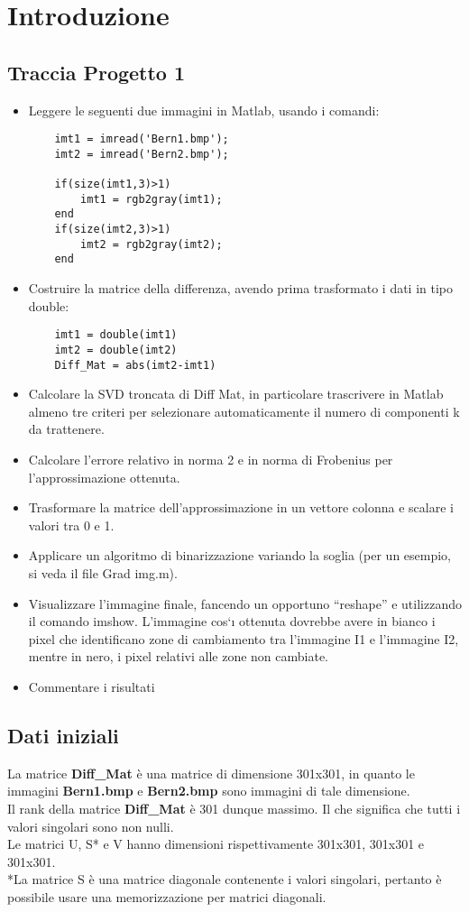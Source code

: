 \section{Introduzione}
\subsection{Traccia Progetto 1}
\begin{itemize}
    \item 

Leggere le seguenti due immagini in Matlab, usando i comandi:

\begin{verbatim}
    imt1 = imread('Bern1.bmp');
    imt2 = imread('Bern2.bmp');
    
    if(size(imt1,3)>1)
        imt1 = rgb2gray(imt1);
    end
    if(size(imt2,3)>1)
        imt2 = rgb2gray(imt2);
    end
\end{verbatim}

 \item Costruire la matrice della differenza, avendo prima trasformato i dati in tipo double:
 \begin{verbatim}
    imt1 = double(imt1)
    imt2 = double(imt2)
    Diff_Mat = abs(imt2-imt1)    
 \end{verbatim}

 
 \item Calcolare la SVD troncata di Diff
 Mat, in particolare trascrivere in Matlab almeno tre criteri
 per selezionare automaticamente il numero di componenti k da trattenere.
 \item Calcolare l’errore relativo in norma 2 e in norma di Frobenius per l’approssimazione ottenuta.
 \item Trasformare la matrice dell’approssimazione in un vettore colonna e scalare i valori tra 0 e 1.
 \item Applicare un algoritmo di binarizzazione variando la soglia (per un esempio, si veda il file
 Grad img.m).
 \item Visualizzare l’immagine finale, fancendo un opportuno “reshape” e utilizzando il comando imshow.
 L’immagine cos`ı ottenuta dovrebbe avere in bianco i pixel che identificano zone di cambiamento
 tra l’immagine I1 e l’immagine I2, mentre in nero, i pixel relativi alle zone non cambiate.
 \item Commentare i risultati

\end{itemize}

\subsection{Dati iniziali}
La matrice \textbf{Diff\_Mat} è una matrice di dimensione 301x301, in quanto le immagini \textbf{Bern1.bmp} e \textbf{Bern2.bmp} sono immagini di tale dimensione.\\
Il rank della matrice \textbf{Diff\_Mat} è 301 dunque massimo. Il che significa che tutti i valori singolari sono non nulli.\\
Le matrici U, S* e V hanno dimensioni rispettivamente 301x301, 301x301 e 301x301.\\

*La matrice S è una matrice diagonale contenente i valori singolari, pertanto è possibile usare una memorizzazione per matrici diagonali.\\